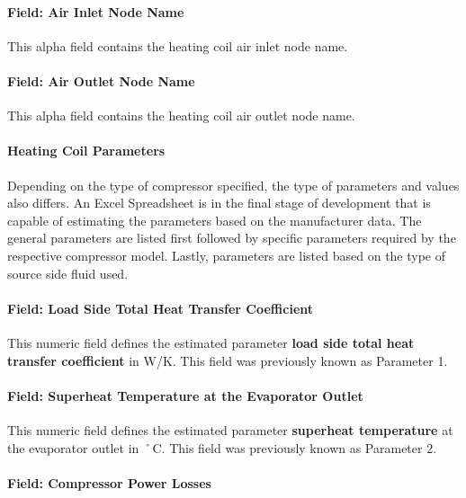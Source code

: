 \paragraph{Field: Air Inlet Node Name}\label{field-air-inlet-node-name-19}

This alpha field contains the heating coil air inlet node name.

\paragraph{Field: Air Outlet Node Name}\label{field-air-outlet-node-name-19}

This alpha field contains the heating coil air outlet node name.

\paragraph{Heating Coil Parameters}\label{heating-coil-parameters}

Depending on the type of compressor specified, the type of parameters and values also differs. An Excel Spreadsheet is in the final stage of development that is capable of estimating the parameters based on the manufacturer data. The general parameters are listed first followed by specific parameters required by the respective compressor model. Lastly, parameters are listed based on the type of source side fluid used.

\paragraph{Field: Load Side Total Heat Transfer Coefficient}\label{field-load-side-total-heat-transfer-coefficient-1}

This numeric field defines the estimated parameter \textbf{load side total heat transfer coefficient} in W/K. This field was previously known as Parameter 1.

\paragraph{Field: Superheat Temperature at the Evaporator Outlet}\label{field-superheat-temperature-at-the-evaporator-outlet-1}

This numeric field defines the estimated parameter \textbf{superheat temperature} at the evaporator outlet in ˚C. This field was previously known as Parameter 2.

\paragraph{Field: Compressor Power Losses}\label{field-compressor-power-losses-1}

